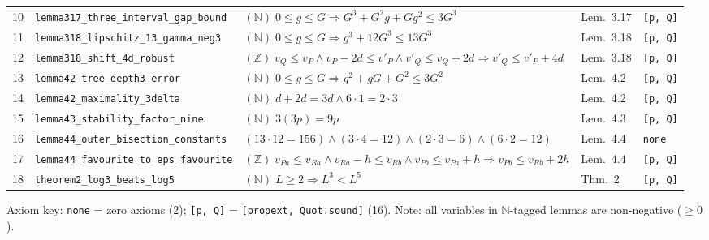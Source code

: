 \documentclass[10pt,twocolumn]{article}
\newcommand{\ZZ}{\mathbb{Z}}
\newcommand{\NN}{\mathbb{N}}
\begin{document}
\begin{table}[t]
{\begin{tabular}{@{}rllll@{}}
10 & \texttt{lemma317\_three\_interval\_gap\_bound} & $(\NN)\;0\le g\le G \Rightarrow G^3 + G^2 g + G g^2 \le 3 G^3$ & Lem.~3.17 & \texttt{[p, Q]} \\
11 & \texttt{lemma318\_lipschitz\_13\_gamma\_neg3} & $(\NN)\;0\le g\le G \Rightarrow g^3 + 12 G^3 \le 13 G^3$ & Lem.~3.18 & \texttt{[p, Q]} \\
12 & \texttt{lemma318\_shift\_4d\_robust} & $(\ZZ)\;v_Q\le v_P \land v_P{-}2d\le v'_P \land v'_Q\le v_Q{+}2d \Rightarrow v'_Q\le v'_P + 4d$ & Lem.~3.18 & \texttt{[p, Q]} \\
13 & \texttt{lemma42\_tree\_depth3\_error} & $(\NN)\;0\le g\le G \Rightarrow g^2 + g G + G^2 \le 3 G^2$ & Lem.~4.2 & \texttt{[p, Q]} \\
14 & \texttt{lemma42\_maximality\_3delta} & $(\NN)\;d + 2d = 3d \land 6\cdot 1 = 2\cdot 3$ & Lem.~4.2 & \texttt{[p, Q]} \\
15 & \texttt{lemma43\_stability\_factor\_nine} & $(\NN)\;3(3p) = 9p$ & Lem.~4.3 & \texttt{[p, Q]} \\
16 & \texttt{lemma44\_outer\_bisection\_constants} & $(13\cdot 12 = 156) \land (3\cdot 4 = 12) \land (2\cdot 3 = 6) \land (6\cdot 2 = 12)$ & Lem.~4.4 & \texttt{none} \\
17 & \texttt{lemma44\_favourite\_to\_eps\_favourite} & $(\ZZ)\;v_{Pa}\le v_{Ra} \land v_{Ra}{-}h\le v_{Rb} \land v_{Pb}\le v_{Pa}{+}h \Rightarrow v_{Pb}\le v_{Rb} + 2h$ & Lem.~4.4 & \texttt{[p, Q]} \\
18 & \texttt{theorem2\_log3\_beats\_log5} & $(\NN)\;L \ge 2 \Rightarrow L^3 < L^5$ & Thm.~2 & \texttt{[p, Q]} \\
\bottomrule
\end{tabular}}
\vspace{-0.3em}
\begin{flushleft}
\tiny Axiom key: \texttt{none} = zero axioms (2); \texttt{[p, Q]} = \texttt{[propext, Quot.sound]} (16). Note: all variables in $\NN$-tagged lemmas are non-negative ($\ge 0$).
\end{flushleft}
\vspace{-0.5em}
\end{table}
\end{document}
